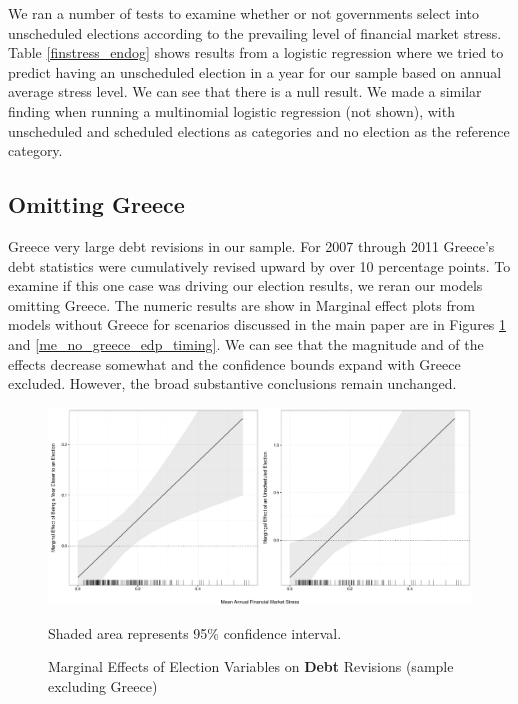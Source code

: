 \documentclass[]{article}
\begin{document}
We ran a number of tests to examine whether or not governments select into unscheduled elections according to the prevailing level of financial market stress. Table \ref{finstress_endog} shows results from a logistic regression where we tried to predict having an unscheduled election in a year for our sample based on annual average stress level. We can see that there is a null result. We made a similar finding when running a multinomial logistic regression (not shown), with unscheduled and scheduled elections as categories and no election as the reference category.



\subsection*{Omitting Greece}

Greece very large debt revisions in our sample. For 2007 through 2011 Greece's debt statistics were cumulatively revised upward by over 10 percentage points. To examine if this one case was driving our election results, we reran our models omitting Greece. The numeric results are show in Marginal effect plots from models without Greece for scenarios discussed in the main paper are in Figures \ref{me_no_greece} and \ref{me_no_greece_edp_timing}. We can see that the magnitude and of the effects decrease somewhat and the confidence bounds expand with Greece excluded. However, the broad substantive conclusions remain unchanged.

\begin{figure}[H]
    \caption{Marginal Effects of Election Variables on \textbf{Debt} Revisions (sample excluding Greece)}
    \label{me_no_greece}

    \begin{center}
        \includegraphics[scale=0.4]{figures/debt_me_nogreece.pdf}
    \end{center}

	{\scriptsize{Shaded area represents 95\% confidence interval.}}

\end{figure}
\end{document}
